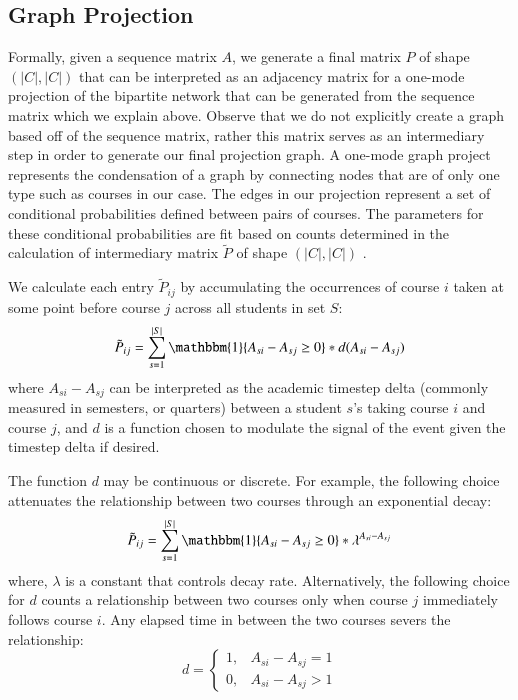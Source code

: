 \documentclass{sigchi}
\begin{document}
\subsection{Graph Projection}
\label{sec:graph_projection}
Formally, given a sequence matrix $A$, we generate a final matrix $P$ of shape $(|C|, |C|)$ that can be interpreted as an adjacency matrix for a one-mode projection of the bipartite network that can be generated from the sequence matrix which we explain above. Observe that we do not explicitly create a graph based off of the sequence matrix, rather this matrix serves as an intermediary step in order to generate our final projection graph. A one-mode graph project represents the condensation of a graph by connecting nodes that are of only one type such as courses in our case. The edges in our projection represent a set of conditional probabilities defined between pairs of courses. %
The parameters for these conditional probabilities are fit based on counts determined in the calculation of intermediary matrix $\tilde{P}$ of shape $(|C|, |C|)$ . 

We calculate each entry $\tilde{P}_{ij}$ by accumulating the occurrences of course $i$ taken at some point before course $j$ across all students in set $S$:
\begin{equation}
  \tilde{P}_{ij} = \sum_{s=1}^{|S|} \mathbbm{1}\{A_{si} - A_{sj} \geq 0\}* d(A_{si} - A_{sj})
\end{equation}
where $A_{si} - A_{sj}$ can be interpreted as the academic timestep delta (commonly measured in semesters, or quarters) between a student $s$'s taking course $i$ and course $j$, and $d$ is a function chosen to modulate the signal of the event given the timestep delta if desired. 

The function $d$ may be continuous or discrete.  For example, the
following choice attenuates the relationship between two courses through an
exponential decay:
\begin{equation}
  \tilde{P}_{ij} = \sum_{s=1}^{|S|} \mathbbm{1}\{A_{si} - A_{sj} \geq 0\}* \lambda^{A_{si} - A_{sj}}
\end{equation}
where, $\lambda$ is a constant that controls decay rate. Alternatively, the following choice for $d$ counts a relationship between two courses only when course $j$ immediately follows course $i$. Any
elapsed time in between the two courses severs the relationship:
\begin{equation}
d = \begin{cases} 
      1, & A_{si} - A_{sj} = 1 \\
      0, & A_{si} - A_{sj} > 1 
    \end{cases}
\end{equation}
\end{document}
